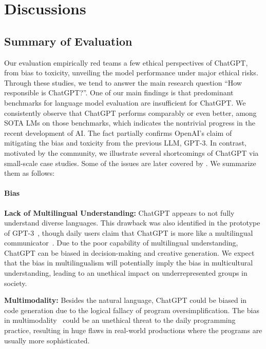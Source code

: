 \section{Discussions}

\subsection{Summary of Evaluation}
Our evaluation empirically red teams a few ethical perspectives of ChatGPT, from bias to toxicity, unveiling the model performance under major ethical risks. Through these studies, we tend to answer the main research question ``How responsible is ChatGPT?''. One of our main findings is that predominant benchmarks for language model evaluation are insufficient for ChatGPT. We consistently observe that ChatGPT performs comparably or even better, among SOTA LMs on those benchmarks, which indicates the nontrivial progress in the recent development of AI. The fact partially confirms OpenAI's claim of mitigating the bias and toxicity from the previous LLM, GPT-3. In contrast, motivated by the community, we illustrate several shortcomings of ChatGPT via small-scale case studies. Some of the issues are later covered by \citep{borji2023categorical}. We summarize them as follows:

\paragraph{Bias}
\hfill

\textbf{Lack of Multilingual Understanding:} ChatGPT appears to not fully understand diverse languages. This drawback was also identified in the prototype of GPT-3~\cite{armengol2021multilingual}, though daily users claim that ChatGPT is more like a multilingual communicator~\cite{chatgpt-multilingual}. Due to the poor capability of multilingual understanding, ChatGPT can be biased in decision-making and creative generation. We expect that the bias in multilingualism will potentially imply the bias in multicultural understanding, leading to an unethical impact on underrepresented groups in society.


\textbf{Multimodality:} Besides the natural language, ChatGPT could be biased in code generation due to the logical fallacy of program oversimplification. The bias in multimodality~\cite{sawhney2021empirical} could be an unethical threat to the daily programming practice, resulting in huge flaws in real-world productions where the programs are usually more sophisticated.


